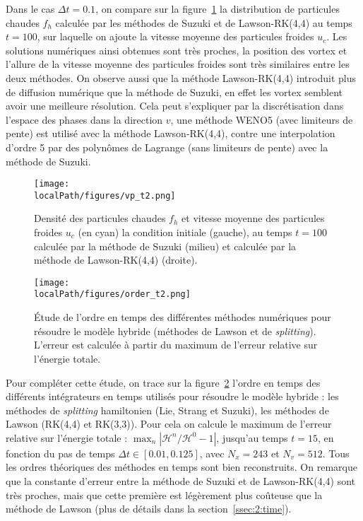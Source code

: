 Dans le cas $\Delta t=0.1$, on compare sur la figure~\ref{fig:vp:t2} la distribution de particules chaudes $f_h$ calculée par les méthodes de Suzuki et de Lawson-RK(4,4) au temps $t=100$, sur laquelle on ajoute la vitesse moyenne des particules froides $u_c$. Les solutions numériques ainsi obtenues sont très proches, la position des vortex et l'allure de la vitesse moyenne des particules froides sont très similaires entre les deux méthodes. On observe aussi que la méthode Lawson-RK(4,4) introduit plus de diffusion numérique que la méthode de Suzuki, en effet les vortex semblent avoir une meilleure résolution. Cela peut s'expliquer par la discrétisation dans l'espace des phases dans la direction $v$, une méthode WENO5 (avec limiteurs de pente) est utilisé avec la méthode Lawson-RK(4,4), contre une interpolation d'ordre 5 par des polynômes de Lagrange (sans limiteurs de pente) avec la méthode de Suzuki.

\begin{figure}[h]
  \centering
  \texttt{[image: \\localPath/figures/vp\_t2.png]}
  \caption{Densité des particules chaudes $f_h$ et vitesse moyenne des particules froides $u_c$ (en cyan) la condition initiale (gauche), au temps $t=100$ calculée par la méthode de Suzuki (milieu) et calculée par la méthode de Lawson-RK(4,4) (droite).}
  \label{fig:vp:t2}
\end{figure}

\begin{figure}
	\centering
	\texttt{[image: \\localPath/figures/order\_t2.png]}
	\caption{Étude de l'ordre en temps des différentes méthodes numériques pour résoudre le modèle hybride (méthodes de Lawson et de \emph{splitting}). L'erreur est calculée à partir du maximum de l'erreur relative sur l'énergie totale.}
	\label{fig:order:t2}
\end{figure}

Pour compléter cette étude, on trace sur la figure~\ref{fig:order:t2} l'ordre en temps des différents intégrateurs en temps utilisés pour résoudre le modèle hybride : les méthodes de \emph{splitting} hamiltonien (Lie, Strang et Suzuki), les méthodes de Lawson (RK(4,4) et RK(3,3)). Pour cela on calcule le maximum de l'erreur relative sur l'énergie totale : $\max_n|\mathcal{H}^n/\mathcal{H}^0-1|$, jusqu'au temps $t=15$, en fonction du pas de temps $\Delta t\in[0.01,0.125]$, avec $N_x=243$ et $N_v=512$. Tous les ordres théoriques des méthodes en temps sont bien reconstruits. On remarque que la constante d'erreur entre la méthode de Suzuki et de Lawson-RK(4,4) sont très proches, mais que cette première est légèrement plus coûteuse que la méthode de Lawson (plus de détails dans la section~\ref{ssec:2:time}).

